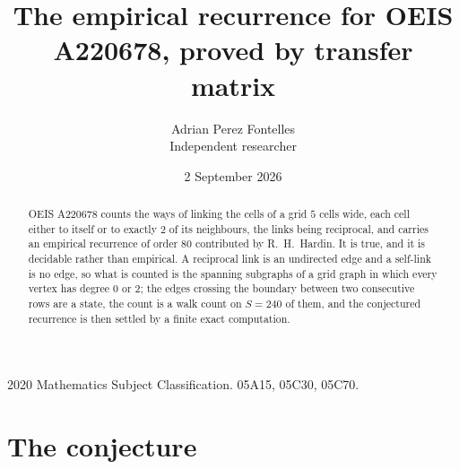 \documentclass[11pt,a4paper]{article}
\title{The empirical recurrence for OEIS A220678, proved by transfer matrix}
\author{Adrian Perez Fontelles\\ \small Independent researcher}
\date{2 September 2026}
\theoremstyle{plain}
\theoremstyle{definition}
\begin{document}
\maketitle

\begin{abstract}
OEIS A220678 counts the ways of linking the cells of a grid $5$ cells wide, each cell either to
itself or to exactly $2$ of its neighbours, the links being reciprocal, and carries an
empirical recurrence of order $80$ contributed by R.~H.~Hardin. It is true, and it is
decidable rather than empirical. A reciprocal link is an undirected edge and a self-link is
no edge, so what is counted is the spanning subgraphs of a grid graph in which every vertex
has degree $0$ or $2$; the edges crossing the boundary between two consecutive rows are a
state, the count is a walk count on $S=240$ of them, and the conjectured recurrence is then
settled by a finite exact computation.
\end{abstract}

\noindent\small 2020 Mathematics Subject Classification. 05A15, 05C30, 05C70.\normalsize

\section{The conjecture}
\end{document}
